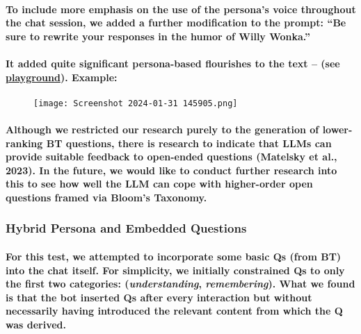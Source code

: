 \documentclass{article}
\begin{document}
\paragraph{To include more emphasis on the use of the persona’s voice throughout the chat session, we added a further modification to the prompt:
“Be sure to rewrite your responses in the humor of Willy Wonka.”
 \\ \\ It added quite significant persona-based flourishes to the text – (see \href{https://platform.openai.com/playground/p/9zytyQlBOhcTsytXaUZWRgNX?mode=chat}{playground}). Example:}

\paragraph{}

\begin{figure}[h]
    \centering
    \texttt{[image: Screenshot 2024-01-31 145905.png]}
    \label{fig:flourish}
\end{figure}

\paragraph{Although we restricted our research purely to the generation of lower-ranking BT questions, there is research to indicate that LLMs can provide suitable feedback to open-ended questions (Matelsky et al., 2023). In the future, we would like to conduct further research into this to see how well the LLM can cope with higher-order open questions framed via Bloom’s Taxonomy.}

\newpage

\subsubsection*{Hybrid Persona and Embedded Questions}

\paragraph{For this test, we attempted to incorporate some basic Qs (from BT) into the chat itself. For simplicity, we initially constrained Qs to only the first two categories: (\textit{understanding}, \textit{remembering}). What we found is that the bot inserted Qs after every interaction but without necessarily having introduced the relevant content from which the Q was derived.}
\end{document}
